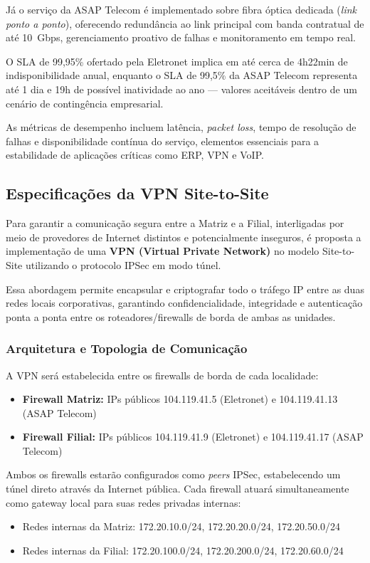 \documentclass[a4paper, 12pt]{article}
\begin{document}
Já o serviço da ASAP Telecom \cite{asap} é implementado sobre fibra óptica dedicada (\textit{link ponto a ponto}), oferecendo redundância ao link principal com banda contratual de até 10~Gbps, gerenciamento proativo de falhas e monitoramento em tempo real.

O SLA de 99,95\% ofertado pela Eletronet implica em até cerca de 4h22min de indisponibilidade anual, enquanto o SLA de 99,5\% da ASAP Telecom representa até 1 dia e 19h de possível inatividade ao ano — valores aceitáveis dentro de um cenário de contingência empresarial. 

As métricas de desempenho incluem latência, \textit{packet loss}, tempo de resolução de falhas e disponibilidade contínua do serviço, elementos essenciais para a estabilidade de aplicações críticas como ERP, VPN e VoIP.

\subsection{Especificações da VPN Site-to-Site}
\label{subsec:vpn}

Para garantir a comunicação segura entre a Matriz e a Filial, interligadas por meio de provedores de Internet distintos e potencialmente inseguros, é proposta a implementação de uma \textbf{VPN (Virtual Private Network)} no modelo Site-to-Site utilizando o protocolo IPSec em modo túnel. 

Essa abordagem permite encapsular e criptografar todo o tráfego IP entre as duas redes locais corporativas, garantindo confidencialidade, integridade e autenticação ponta a ponta entre os roteadores/firewalls de borda de ambas as unidades.

\subsubsection{Arquitetura e Topologia de Comunicação}
\label{subsubsec:vpn-topology}

A VPN será estabelecida entre os firewalls de borda de cada localidade:
\begin{itemize}
    \item \textbf{Firewall Matriz:} IPs públicos 104.119.41.5 (Eletronet) e 104.119.41.13 (ASAP Telecom)
    \item \textbf{Firewall Filial:} IPs públicos 104.119.41.9 (Eletronet) e 104.119.41.17 (ASAP Telecom)
\end{itemize}

Ambos os firewalls estarão configurados como \textit{peers} IPSec, estabelecendo um túnel direto através da Internet pública. Cada firewall atuará simultaneamente como gateway local para suas redes privadas internas:
\begin{itemize}
    \item Redes internas da Matriz: 172.20.10.0/24, 172.20.20.0/24, 172.20.50.0/24
    \item Redes internas da Filial: 172.20.100.0/24, 172.20.200.0/24, 172.20.60.0/24
\end{itemize}
\end{document}
